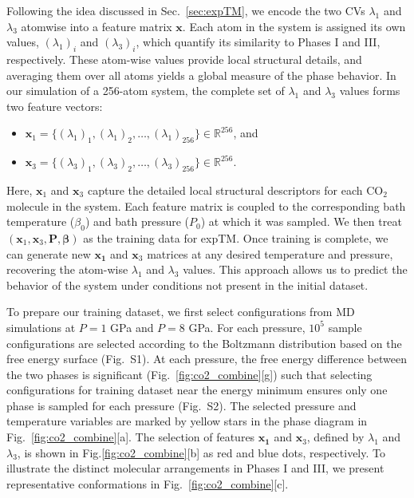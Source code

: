 \documentclass[aip,jcp,reprint,longbibliography]{revtex4-1}
\begin{document}
Following the idea discussed in Sec.~\ref{sec:expTM}, we encode the two CVs $\lambda_1$ and $\lambda_3$ atomwise into a feature matrix $\mathbf{x}$. Each atom in the system is assigned its own values, $(\lambda_1)_i$ and $(\lambda_3)_i$, which quantify its similarity to Phases I and III, respectively. These atom-wise values provide local structural details, and averaging them over all atoms yields a global measure of the phase behavior. In our simulation of a 256-atom system, the complete set of $\lambda_1$ and $\lambda_3$ values forms two feature vectors:  
\begin{itemize}
\item $\mathbf{x}_1 = \{(\lambda_1)_1, (\lambda_1)_2, \ldots, (\lambda_1)_{256}\} \in \mathbb{R}^{256}$, and
\item
 $\mathbf{x}_3 = \{(\lambda_3)_1, (\lambda_3)_2, \ldots, (\lambda_3)_{256}\} \in \mathbb{R}^{256}$.
\end{itemize} 
Here, $\mathbf{x}_1$ and $\mathbf{x}_3$ capture the detailed local structural descriptors for each CO$_2$ molecule in the system. Each feature matrix is coupled to the corresponding bath temperature ($\beta_0$) and bath pressure ($P_0$) at which it was sampled. We then treat $(\mathbf{x}_1, \mathbf{x}_3, \mathbf{P}, \boldsymbol{\beta})$ as the training data for expTM. Once training is complete, we can generate new $\mathbf{x_1}$ and $\mathbf{x}_3$ matrices at any desired temperature and pressure, recovering the atom-wise $\lambda_1$ and $\lambda_3$ values. This approach allows us to predict the behavior of the system under conditions not present in the initial dataset.

To prepare our training dataset, we first select configurations from MD simulations at $ P = 1 $ GPa and $ P = 8$ GPa. For each pressure, $10^5$ sample configurations are selected according to the Boltzmann distribution based on the free energy surface (Fig.~S1). 
At each pressure, the free energy difference between the two phases is significant (Fig.~\ref{fig:co2_combine}[g]) such that selecting configurations for training dataset near the energy minimum ensures only one phase is sampled for each pressure (Fig.~S2). The selected pressure and temperature variables are marked by yellow stars in the phase diagram in Fig.~\ref{fig:co2_combine}[a]. The selection of features $\mathbf{x_1}$ and $\mathbf{x}_3$, defined by $\lambda_1$ and $\lambda_3$, is shown in Fig.\ref{fig:co2_combine}[b] as red and blue dots, respectively. 
To illustrate the distinct molecular arrangements in Phases I and III, we present representative conformations in Fig.~\ref{fig:co2_combine}[c].
\end{document}
